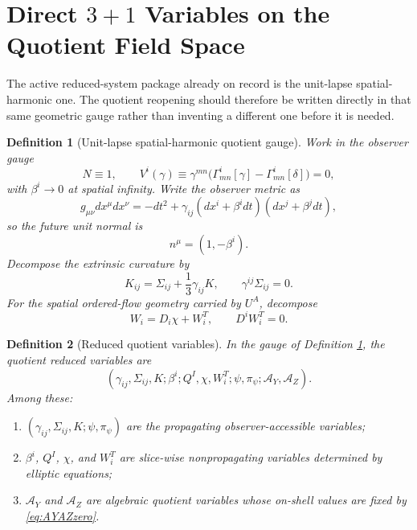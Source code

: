 \documentclass[11pt]{article}
\newcommand{\AY}{\mathcal A_Y}
\newcommand{\AZ}{\mathcal A_Z}
\newtheorem{definition}{Definition}
\begin{document}
\section{Direct \texorpdfstring{$3+1$}{3+1} Variables on the Quotient Field Space}

The active reduced-system package already on record is the unit-lapse spatial-harmonic one. The quotient reopening should therefore be written directly in that same geometric gauge rather than inventing a different one before it is needed.

\begin{definition}[Unit-lapse spatial-harmonic quotient gauge]
\label{def:gauge}
Work in the observer gauge
\begin{equation}
N\equiv 1,
\qquad
V^i(\gamma)\equiv \gamma^{mn}\bigl(\Gamma^i_{mn}[\gamma]-\Gamma^i_{mn}[\delta]\bigr)=0,
\label{eq:gauge}
\end{equation}
with \(\beta^i\to 0\) at spatial infinity. Write the observer metric as
\begin{equation}
g_{\mu\nu}dx^\mu dx^\nu
=
-dt^2
+\gamma_{ij}(dx^i+\beta^idt)(dx^j+\beta^jdt),
\label{eq:ADM}
\end{equation}
so the future unit normal is
\begin{equation}
n^\mu=(1,-\beta^i).
\label{eq:normal}
\end{equation}
Decompose the extrinsic curvature by
\begin{equation}
K_{ij}
=
\Sigma_{ij}+\frac13\gamma_{ij}K,
\qquad
\gamma^{ij}\Sigma_{ij}=0.
\label{eq:Ksplit}
\end{equation}
For the spatial ordered-flow geometry carried by \(U^A\), decompose
\begin{equation}
W_i=D_i\chi+W_i^T,
\qquad
D^iW_i^T=0.
\label{eq:Wdecomp}
\end{equation}
\end{definition}

\begin{definition}[Reduced quotient variables]
\label{def:variables}
In the gauge of Definition \ref{def:gauge}, the quotient reduced variables are
\begin{equation}
(\gamma_{ij},\Sigma_{ij},K;\beta^i;Q^I,\chi,W_i^T;\psi,\pi_\psi;\AY,\AZ).
\label{eq:variables}
\end{equation}
Among these:
\begin{enumerate}
    \item \((\gamma_{ij},\Sigma_{ij},K;\psi,\pi_\psi)\) are the propagating observer-accessible variables;
    \item \(\beta^i\), \(Q^I\), \(\chi\), and \(W_i^T\) are slice-wise nonpropagating variables determined by elliptic equations;
    \item \(\AY\) and \(\AZ\) are algebraic quotient variables whose on-shell values are fixed by \eqref{eq:AYAZzero}.
\end{enumerate}
\end{definition}
\end{document}
